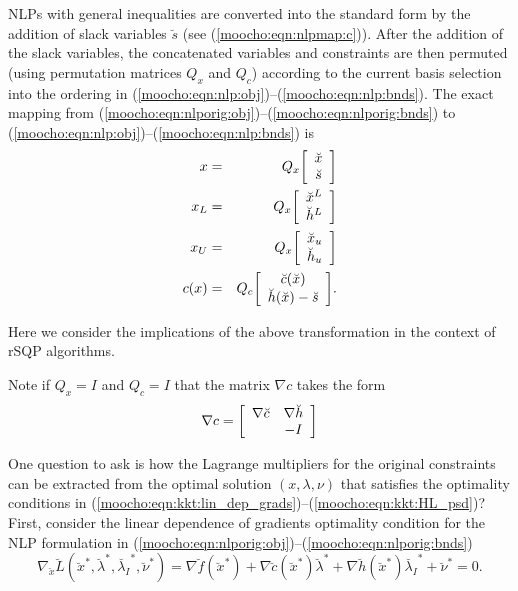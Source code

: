 \documentclass[pdf,ps2pdf,11pt]{SANDreport}
\begin{document}
NLPs with general inequalities are converted into the standard form by
the addition of slack variables $\breve{s}$ (see
(\ref{moocho:eqn:nlpmap:c})).  After the addition of the slack
variables, the concatenated variables and constraints are then
permuted (using permutation matrices $Q_x$ and $Q_c$) according to the
current basis selection into the ordering in
(\ref{moocho:eqn:nlp:obj})--(\ref{moocho:eqn:nlp:bnds}).  The exact
mapping from
(\ref{moocho:eqn:nlporig:obj})--(\ref{moocho:eqn:nlporig:bnds}) to
(\ref{moocho:eqn:nlp:obj})--(\ref{moocho:eqn:nlp:bnds}) is
%
{\bsinglespace
\begin{eqnarray}
x & = & Q_x {\bmat{c} \breve{x} \\ \breve{s} \emat} \label{moocho:eqn:nlpmap:x} \\
x_L & = & Q_x {\bmat{c} \breve{x}^L \\ \breve{h}^L \emat} \label{moocho:eqn:nlpmap:xl} \\
x_U & = & Q_x {\bmat{c} \breve{x}_u \\ \breve{h}_u \emat} \label{moocho:eqn:nlpmap:xu} \\
c(x) & = & Q_c {\bmat{c} \breve{c}(\breve{x}) \\ \breve{h}(\breve{x}) - \breve{s} \emat}.
\label{moocho:eqn:nlpmap:c}
\end{eqnarray}
\esinglespace}

Here we consider the implications of the above transformation in the context
of rSQP algorithms.

Note if $Q_x = I$ and $Q_c = I$ that the matrix $\nabla c$ takes the form
%
\begin{equation}
\nabla c = {\bmat{cc} \nabla \breve{c} & \nabla \breve{h} \\ & -I \emat}
	\label{moocho:eqn:Gc_orig}
\end{equation}

One question to ask is how the Lagrange multipliers for the original
constraints can be extracted from the optimal solution $(x,\lambda,\nu)$ that
satisfies the optimality conditions in
(\ref{moocho:eqn:kkt:lin_dep_grads})--(\ref{moocho:eqn:kkt:HL_psd})?  First,
consider the linear dependence of gradients optimality condition for the NLP
formulation in (\ref{moocho:eqn:nlporig:obj})--(\ref{moocho:eqn:nlporig:bnds})
%
\begin{equation}
\nabla_{\breve{x}} \breve{L}(\breve{x}^*,\breve{\lambda}^*,\breve{\lambda_I}^*,\breve{\nu}^*)
= \nabla \breve{f}(\breve{x}^*) + \nabla \breve{c}(\breve{x}^*) \breve{\lambda}^*
+ \nabla \breve{h}(\breve{x}^*) \breve{\lambda_I}^* + \breve{\nu}^* = 0.
\label{moocho:eqn:kktorig:lin_dep_grads}
\end{equation}
\end{document}
